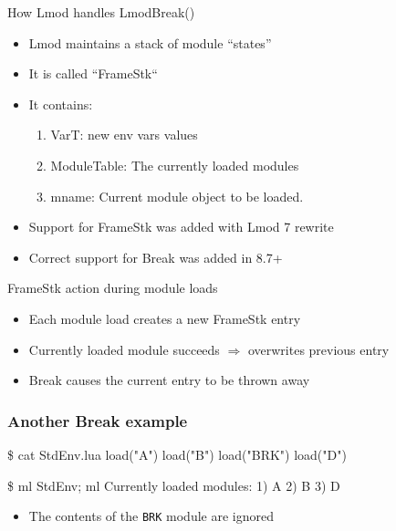 \documentclass{beamer}
\begin{document}
\begin{frame}{How Lmod handles LmodBreak()}
  \begin{itemize}
    \item Lmod maintains a stack of module ``states''
    \item It is called ``FrameStk``
    \item It contains:
      \begin{enumerate}
        \item VarT: new env vars values
        \item ModuleTable: The currently loaded modules
        \item mname:  Current module object to be loaded.
      \end{enumerate}
    \item Support for FrameStk was added with Lmod 7 rewrite
    \item Correct support for Break was added in 8.7+
  \end{itemize}
\end{frame}

\begin{frame}{FrameStk action during module loads}
  \begin{itemize}
    \item Each module load creates a new FrameStk entry
    \item Currently loaded module succeeds $\Rightarrow$ overwrites
      previous entry
    \item Break causes the current entry to be thrown away
  \end{itemize}
\end{frame}

\begin{frame}[fragile]
    \frametitle{Another Break example}
 {\tiny
    \begin{semiverbatim}
\$ cat StdEnv.lua
load("A")        
load("B")        
load("BRK")        
load("D")

\$ ml StdEnv; ml
Currently loaded modules:
  1) A   2) B  3) D
    \end{semiverbatim}
}
  \begin{itemize}
    \item The contents of the \texttt{BRK} module are ignored
  \end{itemize}

\end{frame}
\end{document}
